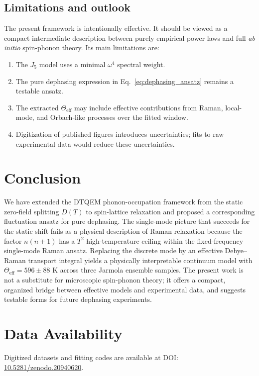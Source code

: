 \documentclass[12pt,a4paper]{article}
\begin{document}
\subsection{Limitations and outlook}
The present framework is intentionally effective. It should be viewed as a compact intermediate description between purely empirical power laws and full \textit{ab initio} spin-phonon theory. Its main limitations are:
\begin{enumerate}
\item The $J_5$ model uses a minimal $\omega^4$ spectral weight.
\item The pure dephasing expression in Eq.~\eqref{eq:dephasing_ansatz} remains a testable ansatz.
\item The extracted $\Theta_{\mathrm{eff}}$ may include effective contributions from Raman, local-mode, and Orbach-like processes over the fitted window.
\item Digitization of published figures introduces uncertainties; fits to raw experimental data would reduce these uncertainties.
\end{enumerate}

\section{Conclusion}
We have extended the DTQEM phonon-occupation framework from the static zero-field splitting $D(T)$ to spin-lattice relaxation and proposed a corresponding fluctuation ansatz for pure dephasing. The single-mode picture that succeeds for the static shift fails as a physical description of Raman relaxation because the factor $n(n+1)$ has a $T^2$ high-temperature ceiling within the fixed-frequency single-mode Raman ansatz. Replacing the discrete mode by an effective Debye--Raman transport integral yields a physically interpretable continuum model with $\Theta_{\mathrm{eff}}=596\pm88$ K across three Jarmola ensemble samples. The present work is not a substitute for microscopic spin-phonon theory; it offers a compact, organized bridge between effective models and experimental data, and suggests testable forms for future dephasing experiments.

\section*{Data Availability}
Digitized datasets and fitting codes are available at DOI: \href{https://doi.org/10.5281/zenodo.20940620}{10.5281/zenodo.20940620}.
\end{document}
